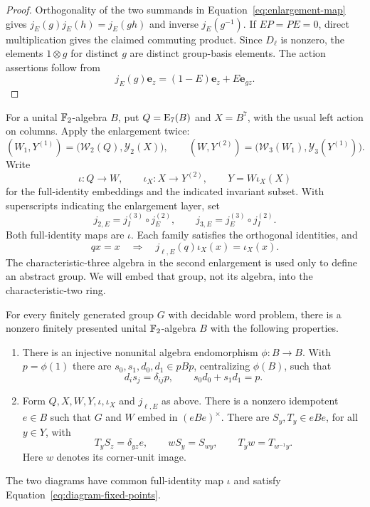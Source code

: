 \begin{proof}
Orthogonality of the two summands in
Equation~\eqref{eq:enlargement-map} gives
$j_E(g)j_E(h)=j_E(gh)$ and inverse $j_E(g^{-1})$.
If $EP=PE=0$, direct multiplication gives the claimed commuting
product.  Since $D_\ell$ is nonzero, the elements $1\otimes g$
for distinct $g$ are distinct group-basis elements.  The action
assertions follow from
\[
 j_E(g)\mathbf e_z=(1-E)\mathbf e_z+E\mathbf e_{gz}.
\]
\end{proof}

For a unital $\mathbb F_2$-algebra $B$, put $Q=\mathrm E_7(B)$ and $X=B^7$,
with the usual left action on columns.  Apply the enlargement twice:
\begin{equation}\label{eq:two-enlargements}
 (W_1,Y^{(1)})=\bigl(\mathcal W_2(Q),\mathcal Y_2(X)\bigr),
 \qquad
 (W,Y^{(2)})=\bigl(\mathcal W_3(W_1),\mathcal Y_3(Y^{(1)})\bigr).
\end{equation}
Write
\[
 \iota:Q\longrightarrow W,\qquad
 \iota_X:X\longrightarrow Y^{(2)},\qquad
 Y=W\iota_X(X)
\]
for the full-identity embeddings and the indicated invariant subset.
With superscripts indicating the enlargement layer, set
\begin{equation}\label{eq:two-diagrams}
 j_{2,E}=j_I^{(3)}\circ j_E^{(2)},\qquad
 j_{3,E}=j_E^{(3)}\circ j_I^{(2)}.
\end{equation}
Both full-identity maps are $\iota$.  Each family satisfies the
orthogonal identities, and
\begin{equation}\label{eq:diagram-fixed-points}
 qx=x\quad\Longrightarrow\quad
 j_{\ell,E}(q)\iota_X(x)=\iota_X(x).
\end{equation}
The characteristic-three algebra in the second enlargement is used
only to define an abstract group.  We will embed that group, not
its algebra, into the characteristic-two ring.

\begin{theorem}\label{thm:ring-data}
For every finitely generated group $G$ with decidable word problem,
there is a nonzero finitely presented unital $\mathbb F_2$-algebra $B$
with the following properties.
\begin{enumerate}[label=\textup{(\roman*)}]
\item There is an injective nonunital algebra endomorphism
  $\phi:B\to B$.  With $p=\phi(1)$ there are
  $s_0,s_1,d_0,d_1\in pBp$, centralizing $\phi(B)$, such that
  \begin{equation}\label{eq:ring-binary-pairs}
   d_i s_j=\delta_{ij}p,\qquad s_0d_0+s_1d_1=p.
  \end{equation}
\item Form $Q,X,W,Y,\iota,\iota_X$ and $j_{\ell,E}$ as above.
  There is a nonzero idempotent $e\in B$ such that $G$ and $W$
  embed in $(eBe)^\times$.  There are $S_y,T_y\in eBe$, for
  all $y\in Y$, with
  \begin{equation}\label{eq:ring-prefix-data}
   T_yS_z=\delta_{yz}e,\qquad
   wS_y=S_{wy},\qquad T_yw=T_{w^{-1}y}.
  \end{equation}
  Here $w$ denotes its corner-unit image.
\end{enumerate}
The two diagrams have common full-identity map $\iota$ and
satisfy Equation~\eqref{eq:diagram-fixed-points}.
\end{theorem}

